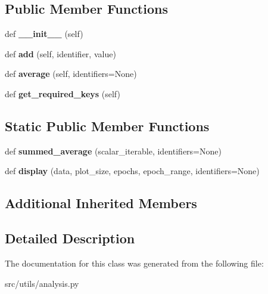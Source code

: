 \subsection*{Public Member Functions}
\begin{DoxyCompactItemize}
\item 
def {\bfseries \+\_\+\+\_\+init\+\_\+\+\_\+} (self)\hypertarget{classanalysis_1_1ScalarData_ab3f9d38ec63b86032a745092f2a7051d}{}\label{classanalysis_1_1ScalarData_ab3f9d38ec63b86032a745092f2a7051d}

\item 
def {\bfseries add} (self, identifier, value)\hypertarget{classanalysis_1_1ScalarData_ac05a78452096d62b98c4125a4eaca10a}{}\label{classanalysis_1_1ScalarData_ac05a78452096d62b98c4125a4eaca10a}

\item 
def {\bfseries average} (self, identifiers=None)\hypertarget{classanalysis_1_1ScalarData_a7c9b0a14712715f28bb0474341138d81}{}\label{classanalysis_1_1ScalarData_a7c9b0a14712715f28bb0474341138d81}

\item 
def {\bfseries get\+\_\+required\+\_\+keys} (self)\hypertarget{classanalysis_1_1ScalarData_ab66c0d3737372775c21cebc2140f01c6}{}\label{classanalysis_1_1ScalarData_ab66c0d3737372775c21cebc2140f01c6}

\end{DoxyCompactItemize}
\subsection*{Static Public Member Functions}
\begin{DoxyCompactItemize}
\item 
def {\bfseries summed\+\_\+average} (scalar\+\_\+iterable, identifiers=None)\hypertarget{classanalysis_1_1ScalarData_afd04d062589ea87ba4c2ebcd4ea6ed30}{}\label{classanalysis_1_1ScalarData_afd04d062589ea87ba4c2ebcd4ea6ed30}

\item 
def {\bfseries display} (data, plot\+\_\+size, epochs, epoch\+\_\+range, identifiers=None)\hypertarget{classanalysis_1_1ScalarData_ac7d17715a8ddd9440a7eb0bf6333dedf}{}\label{classanalysis_1_1ScalarData_ac7d17715a8ddd9440a7eb0bf6333dedf}

\end{DoxyCompactItemize}
\subsection*{Additional Inherited Members}


\subsection{Detailed Description}
\begin{DoxyVerb}\end{DoxyVerb}
 

The documentation for this class was generated from the following file\+:\begin{DoxyCompactItemize}
\item 
src/utils/analysis.\+py\end{DoxyCompactItemize}
